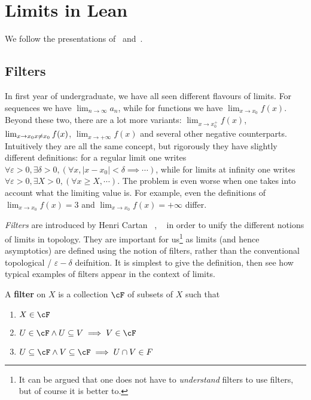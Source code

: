 \section{Limits in Lean}

We follow the presentations of~\cite{HIH2013} and~\cite{BCM2020}.

\subsection{Filters}


In first year of undergraduate, we have all seen different flavours of limits. For sequences we have \(\lim_{n \to \infty} a_n\), while for functions we have \(\lim_{x \to x_0} f(x)\). Beyond these two, there are a lot more variants: \(\lim_{x \to x_0^+} f(x)\), \(\lim_{x \to x_0 \\ x \neq x_0} f(x)\), \(\lim_{x \to +\infty} f(x)\) and several other negative counterparts. Intuitively they are all the same concept, but rigorously they have slightly different definitions: for a regular limit one writes \(\forall \varepsilon > 0, \exists \delta > 0, (\forall x, |x - x_0| < \delta \implies \cdots)\), while for limits at infinity one writes \(\forall \varepsilon > 0, \exists X > 0, (\forall x \geq X, \cdots)\). The problem is even worse when one takes into account what the limiting value is. For example, even the definitions of \(\lim_{x \to x_0} f(x) = 3\) and \(\lim_{x \to x_0} f(x) = +\infty\) differ.

\textit{Filters} are introduced by Henri Cartan ~\cite{Cartan1937a}, ~\cite{Cartan1937b} in order to unify the different notions of limits in topology. They are important for us\footnote{It can be argued that one does not have to \textit{understand} filters to use filters, but of course it is better to.} as limits (and hence asymptotics) are defined using the notion of filters, rather than the conventional topological / \(\varepsilon-\delta\) deifnition. It is simplest to give the definition, then see how typical examples of filters appear in the context of limits.

\begin{definition}
  A \textbf{filter} on \(X\) is a collection \(\cF\) of subsets of \(X\) such that
  \begin{enumerate}
    \item \(X \in \cF\)
    \item \(U \in \cF \land U \subseteq V \implies V \in \cF\)
    \item \(U \subseteq \cF \land V \subseteq \cF \implies U \cap V \in F\)
  \end{enumerate}
\end{definition}

